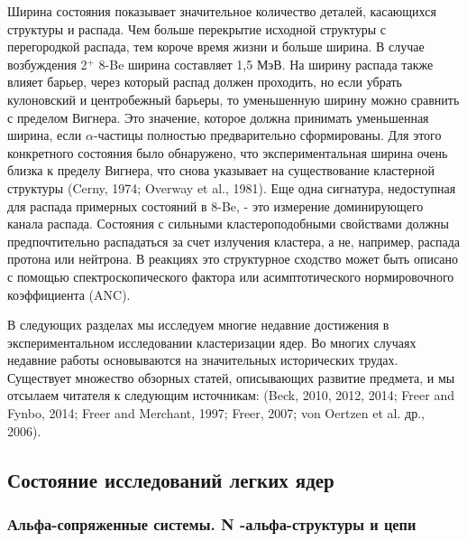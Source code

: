 \documentclass[fontsize=14pt]{scrarticle}
\begin{document}
Ширина состояния показывает значительное количество деталей, касающихся структуры и распада. Чем больше перекрытие исходной структуры с перегородкой распада, тем короче время жизни и больше ширина. В случае возбуждения 2$^{+}$ 8-Be ширина составляет 1,5 МэВ. На ширину распада также влияет барьер, через который распад должен проходить, но если убрать кулоновский и центробежный барьеры, то уменьшенную ширину можно сравнить с пределом Вигнера. Это значение, которое должна принимать уменьшенная ширина, если $\alpha$-частицы полностью предварительно сформированы. Для этого конкретного состояния было обнаружено, что экспериментальная ширина очень близка к пределу Вигнера, что снова указывает на существование кластерной структуры (Cerny, 1974; Overway et al., 1981). Еще одна сигнатура, недоступная для распада примерных состояний в 8-Be, - это измерение доминирующего канала распада. Состояния с сильными кластероподобными свойствами должны предпочтительно распадаться за счет излучения кластера, а не, например, распада протона или нейтрона. В реакциях это структурное сходство может быть описано с помощью спектроскопического фактора или асимптотического нормировочного коэффициента (ANC).

В следующих разделах мы исследуем многие недавние достижения в экспериментальном исследовании кластеризации ядер. Во многих случаях недавние работы основываются на значительных исторических трудах. Существует множество обзорных статей, описывающих развитие предмета, и мы отсылаем читателя к следующим источникам: (Beck, 2010, 2012, 2014; Freer and Fynbo, 2014; Freer and Merchant, 1997; Freer, 2007; von Oertzen et al. др., 2006).

\subsection{ Состояние исследований легких ядер}
\subsubsection{ Альфа-сопряженные системы. N -альфа-структуры и цепи}
\hspace{0.6cm}
\end{document}
